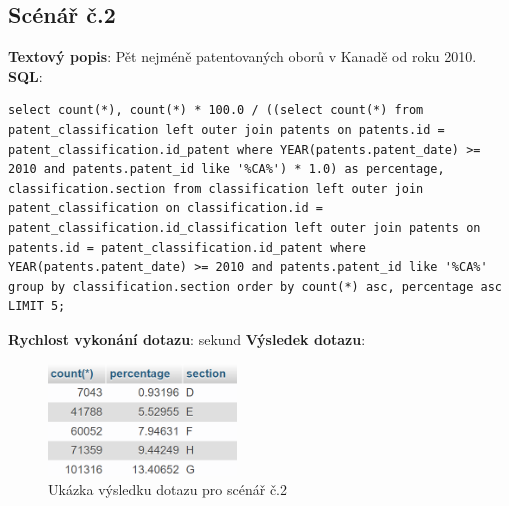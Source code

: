\newpage
\subsection{Scénář č.2}
\textbf{Textový popis}: Pět nejméně patentovaných oborů v Kanadě od roku 2010.
\newline
\textbf{SQL}: 
\begin{lstlisting}[label = {lst:elements_a}]
select count(*), count(*) * 100.0 / ((select count(*) from patent_classification left outer join patents on patents.id = patent_classification.id_patent where YEAR(patents.patent_date) >= 2010 and patents.patent_id like '%CA%') * 1.0) as percentage, classification.section from classification left outer join patent_classification on classification.id = patent_classification.id_classification left outer join patents on patents.id = patent_classification.id_patent where YEAR(patents.patent_date) >= 2010 and patents.patent_id like '%CA%' group by classification.section order by count(*) asc, percentage asc LIMIT 5;
\end{lstlisting}
\textbf{Rychlost vykonání dotazu}:  sekund
\newline
\textbf{Výsledek dotazu}:
\begin{figure}[H]
\centering
\includegraphics[width=5cm]{img/scenare/scenar_2}
\caption{Ukázka výsledku dotazu pro scénář č.2}
\label{fig:scenar2}
\end{figure}

\newpage
